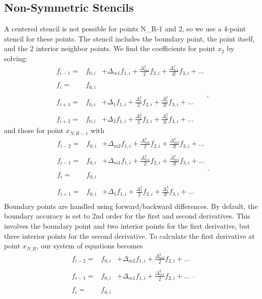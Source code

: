 \documentclass[12pt,letterpaper]{article}
\def\dfz{f_{0,i}}
\def\df{f_{1,i}}
\def\ddf{f_{2,i}}
\def\dddf{f_{3,i}}
\def\dmm{\Delta_{m2}}
\def\dm{\Delta_{m1}}
\def\dpl{\Delta_{1}}
\def\dpp{\Delta_{2}}
\begin{document}
\subsection{Non-Symmetric Stencils}
A centered stencil is not possible for points N\_R-1 and 2, so  we use a 4-point stencil for these points.  The stencil includes the boundary point, the point itself, and the 2 interior neighbor points.  We find the coefficients for point $x_2$ by solving:
\begin{equation}
\begin{array}{ccc}
f_{i-1} = & \dfz & +  \dm\df+\frac{\dm^2}{2}\ddf+\frac{\dm^3}{3!}\dddf  +...\\
\\
 f_{i}  = & \dfz & \\
\\
f_{i+1} = & \dfz & + \dpl\df+\frac{\dpl^2}{2}\ddf+\frac{\dpl^3}{3!}\dddf +...\\
\\
f_{i+2} = & \dfz & + \dpp\df+\frac{\dpp^2}{2}\ddf+\frac{\dpp^3}{3!}\dddf +...
\end{array},
\end{equation}
and those for point $x_{N\_R-1}$ with
\begin{equation}
\begin{array}{ccc}
f_{i-2} = & \dfz & +  \dmm\df+\frac{\dmm^2}{2}\ddf+\frac{\dmm^3}{3!}\dddf+ ...\\
\\
f_{i-1} = & \dfz & +  \dm\df+\frac{\dm^2}{2}\ddf+\frac{\dm^3}{3!}\dddf  +...\\
\\
 f_{i}  = & \dfz & \\
\\
f_{i+1} = & \dfz & + \dpl\df+\frac{\dpl^2}{2}\ddf+\frac{\dpl^3}{3!}\dddf +...\\
\end{array}.
\end{equation} 
Boundary points are handled using forward/backward differences.  By default, the boundary accuracy is set to 2nd order for the first and second derivatives.  This involves the boundary point and two interior points for the first derivative, but three interior points for the second derivative.  To calculate the first derivative at point $x_{N\_R}$, our system of equations becomes
\begin{equation}
\begin{array}{ccc}
f_{i-2} = & \dfz & +  \dmm\df+\frac{\dmm^2}{2}\ddf+...\\
\\
f_{i-1} = & \dfz & +  \dm\df+\frac{\dm^2}{2}\ddf  +...\\
\\
 f_{i}  = & \dfz & \\
\end{array}.
\end{equation}
\end{document}
